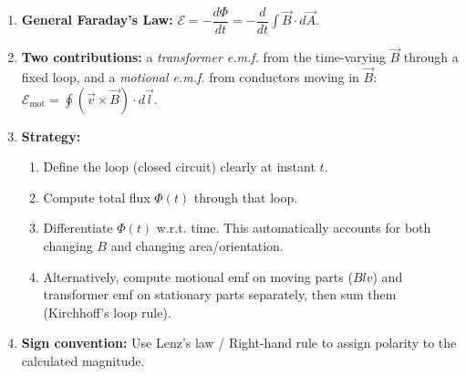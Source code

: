 \documentclass[11pt]{article}
\begin{document}
\begin{methode}
\begin{enumerate}
\item \textbf{General Faraday's Law:} $\mathcal{E} = -\dfrac{d\Phi}{dt} = -\dfrac{d}{dt}\int \vec{B} \cdot d\vec{A}$.
\item \textbf{Two contributions:} a \emph{transformer e.m.f.} from the time-varying $\vec{B}$ through a fixed loop, and a \emph{motional e.m.f.} from conductors moving in $\vec{B}$: $\mathcal{E}_{\text{mot}} = \oint (\vec{v} \times \vec{B}) \cdot d\vec{l}$.
\item \textbf{Strategy:}
    \begin{enumerate}
    \item Define the loop (closed circuit) clearly at instant $t$.
    \item Compute total flux $\Phi(t)$ through that loop.
    \item Differentiate $\Phi(t)$ w.r.t. time. This automatically accounts for both changing $B$ and changing area/orientation.
    \item Alternatively, compute motional emf on moving parts ($Blv$) and transformer emf on stationary parts separately, then sum them (Kirchhoff's loop rule).
    \end{enumerate}
\item \textbf{Sign convention:} Use Lenz's law / Right-hand rule to assign polarity to the calculated magnitude.
\end{enumerate}
\end{methode}
\end{document}
